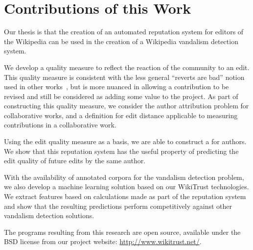 \section{Contributions of this Work}

Our thesis is that the creation of an automated reputation system
for editors of the Wikipedia can be used in the creation
of a Wikipedia vandalism detection system.

We develop a quality measure to reflect the reaction of
the community to an edit.
This quality measure is consistent with the less general
``reverts are bad'' notion used in other
works~\cite{Smets2008,Itakura2009,Belani2010,West2010},
but is more nuanced in allowing a contribution to be revised
and still be considered as adding some value to the project.
As part of constructing this quality measure, we consider the
author attribution problem for collaborative works,
and a definition for edit distance applicable to
measuring contributions in a collaborative work.

Using the edit quality measure as a basis, we are able
to construct a  for authors.
We show that this reputation system has the useful property
of predicting the edit quality of future edits by the same
author.

With the availability of annotated corpora for the vandalism
detection problem, we also develop a machine learning solution based on our
WikiTrust technologies.
We extract features based on calculations made as part of the
reputation system and show that the resulting predictions perform
competitively against other vandalism detection solutions.

The programs resulting from this research are open source,
available under the BSD license from our project website:
\url{http://www.wikitrust.net/}.

